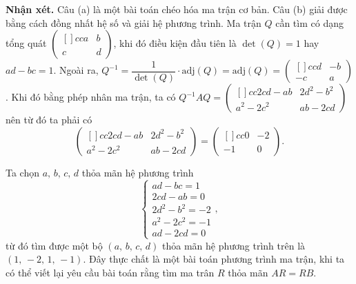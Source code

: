 \textbf{Nhận xét. }Câu (a) là một bài toán chéo hóa ma trận cơ bản. Câu (b) giải được bằng cách đồng nhất hệ số và giải hệ phương trình. Ma trận $Q$ cần tìm có dạng tổng quát $\begin{pmatrix}[]{cc}
    a & b \\
    c & d 
\end{pmatrix}$, khi đó điều kiện đầu tiên là $\det(Q) = 1$ hay $ad - bc = 1$. Ngoài ra, $Q^{-1} = \dfrac{1}{\det (Q)} \cdot \text{adj}(Q) = \text{adj}(Q) = \begin{pmatrix}[]{cc}
    d & -b \\
    -c & a 
\end{pmatrix}$. Khi đó bằng phép nhân ma trận, ta có $Q^{-1}AQ = \begin{pmatrix}[]{cc}
    2cd-ab & 2d^2-b^2 \\
    a^2-2c^2 & ab-2cd 
\end{pmatrix}$ nên từ đó ta phải có $$\begin{pmatrix}[]{cc}
    2cd-ab & 2d^2-b^2 \\
    a^2-2c^2 & ab-2cd 
\end{pmatrix} = \begin{pmatrix}[]{cc}
    0 & -2 \\
    -1 & 0 
\end{pmatrix}.$$ 

Ta chọn $a,\,b,\,c,\,d$ thỏa mãn hệ phương trình $$\begin{cases}
    ad - bc = 1 \\
    2cd - ab = 0 \\
    2d^2 - b^2 = -2 \\
    a^2 - 2c^2 = -1 \\
    ad - 2cd = 0
\end{cases},$$
từ đó tìm được một bộ $(a,\,b,\,c,\,d)$ thỏa mãn hệ phương trình trên là $(1,\,-2,\,1,\,-1)$. Đây thực chất là một bài toán phương trình ma trận, khi ta có thể viết lại yêu cầu bài toán rằng tìm ma trân $R$ thỏa mãn $AR = RB$.

